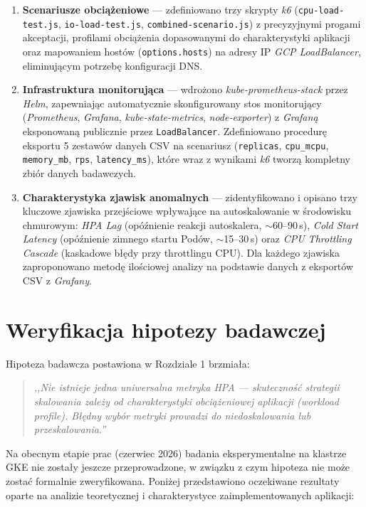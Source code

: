 \begin{enumerate}
  \item \textbf{Scenariusze obciążeniowe} — zdefiniowano trzy skrypty \textit{k6} (\texttt{cpu-load-test.js}, \texttt{io-load-test.js}, \texttt{combined-scenario.js}) z precyzyjnymi progami akceptacji, profilami obciążenia dopasowanymi do charakterystyki aplikacji oraz mapowaniem hostów (\texttt{options.hosts}) na adresy IP \textit{GCP LoadBalancer}, eliminującym potrzebę konfiguracji DNS.

  \item \textbf{Infrastruktura monitorująca} — wdrożono \textit{kube-prometheus-stack} przez \textit{Helm}, zapewniając automatycznie skonfigurowany stos monitorujący (\textit{Prometheus}, \textit{Grafana}, \textit{kube-state-metrics}, \textit{node-exporter}) z \textit{Grafaną} eksponowaną publicznie przez \texttt{LoadBalancer}. Zdefiniowano procedurę eksportu 5 zestawów danych CSV na scenariusz (\texttt{replicas}, \texttt{cpu\_mcpu}, \texttt{memory\_mb}, \texttt{rps}, \texttt{latency\_ms}), które wraz z wynikami \textit{k6} tworzą kompletny zbiór danych badawczych.

  \item \textbf{Charakterystyka zjawisk anomalnych} — zidentyfikowano i opisano trzy kluczowe zjawiska przejściowe wpływające na autoskalowanie w środowisku chmurowym: \textit{HPA Lag} (opóźnienie reakcji autoskalera, $\sim$60--90\,s), \textit{Cold Start Latency} (opóźnienie zimnego startu Podów, $\sim$15--30\,s) oraz \textit{CPU Throttling Cascade} (kaskadowe błędy przy throttlingu CPU). Dla każdego zjawiska zaproponowano metodę ilościowej analizy na podstawie danych z eksportów CSV z \textit{Grafany}.
\end{enumerate}

\section{Weryfikacja hipotezy badawczej}


Hipoteza badawcza postawiona w Rozdziale 1 brzmiała:

\begin{quote}
\textit{,,Nie istnieje jedna uniwersalna metryka HPA — skuteczność strategii skalowania zależy od charakterystyki obciążeniowej aplikacji (\textit{workload profile}). Błędny wybór metryki prowadzi do niedoskalowania lub przeskalowania.''}
\end{quote}

Na obecnym etapie prac (czerwiec 2026) badania eksperymentalne na klastrze GKE nie zostały jeszcze przeprowadzone, w związku z czym hipoteza nie może zostać formalnie zweryfikowana. Poniżej przedstawiono oczekiwane rezultaty oparte na analizie teoretycznej i charakterystyce zaimplementowanych aplikacji:

